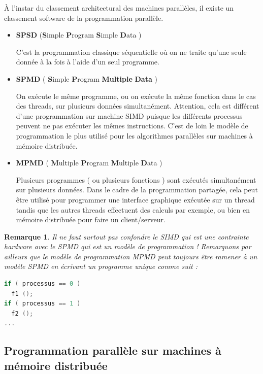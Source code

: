 \documentclass[fleqn,11pt]{article}
\newtheorem{remark}{Remarque }
\begin{document}
À l'instar du classement architectural des machines parallèles, il existe
un classement software de la programmation parallèle.

\begin{itemize}
\item \textbf{SPSD} ({\bf S}imple {\bf P}rogram {\bf S}imple {\bf D}ata )

C'est la programmation classique séquentielle où on ne traite qu'une seule
donnée à la fois à l'aide d'un seul programme. 

\item \textbf{SPMD} ( {\bf S}imple {\bf P}rogram {\bf Multiple} {\bf Data} )

On exécute le même programme, ou on exécute la même fonction dans le cas des threads,
sur plusieurs données simultanément. Attention, cela est différent d'une programmation
sur machine SIMD puisque les différents processus peuvent ne pas exécuter les mêmes
instructions. C'est de loin le modèle de programmation le plus utilisé pour les
algorithmes parallèles sur machines à mémoire distribuée.

\item \textbf{MPMD} ( {\bf M}ultiple {\bf P}rogram {\bf M}ultiple {\bf D}ata )

Plusieurs programmes ( ou plusieurs fonctions ) sont exécutés simultanément
sur plusieurs données. Dans le cadre de la programmation partagée, cela peut être
utilisé pour programmer une interface graphique exécutée sur un thread tandis
que les autres threads effectuent des calculs par exemple, ou bien en mémoire
distribuée pour faire un client/serveur.
\end{itemize}

\begin{remark}
Il ne faut surtout pas confondre le SIMD qui est une contrainte hardware avec
le SPMD qui est un modèle de programmation ! 
Remarquons par ailleurs que le modèle de programmation MPMD peut toujours 
être ramener à un modèle SPMD en écrivant un programme unique comme suit :
\begin{lstlisting}[language=C++]
if ( processus == 0 )
  f1 ();
if ( processus == 1 )
  f2 ();
...
\end{lstlisting} 
\end{remark}

\subsection{Programmation parallèle sur machines à mémoire distribuée}
\end{document}

